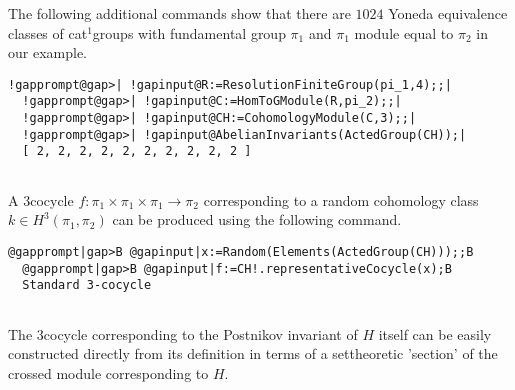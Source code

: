 \documentclass[a4paper,11pt]{report}
\begin{document}
{{\begin{Verbatim}[commandchars=!@|,fontsize=\small,frame=single,label=Example]
\end{Verbatim}
 

 The following additional commands show that there are $1024$ Yoneda equivalence classes of cat$^1$\texttt{}groups with fundamental group $\pi_1$ and $\pi_1$\texttt{} module equal to $\pi_2$ in our example. 
\begin{Verbatim}[commandchars=!@|,fontsize=\small,frame=single,label=Example]
  !gapprompt@gap>| !gapinput@R:=ResolutionFiniteGroup(pi_1,4);;|
  !gapprompt@gap>| !gapinput@C:=HomToGModule(R,pi_2);;|
  !gapprompt@gap>| !gapinput@CH:=CohomologyModule(C,3);;|
  !gapprompt@gap>| !gapinput@AbelianInvariants(ActedGroup(CH));|
  [ 2, 2, 2, 2, 2, 2, 2, 2, 2, 2 ]
  
\end{Verbatim}
 A $3$\texttt{}cocycle $f \colon \pi_1 \times \pi_1 \times \pi_1 \rightarrow \pi_2$ corresponding to a random cohomology class $k\in H^3(\pi_1,\pi_2)$ can be produced using the following command. }

 
\begin{Verbatim}[commandchars=@|B,fontsize=\small,frame=single,label=Example]
  @gapprompt|gap>B @gapinput|x:=Random(Elements(ActedGroup(CH)));;B
  @gapprompt|gap>B @gapinput|f:=CH!.representativeCocycle(x);B
  Standard 3-cocycle 
  
\end{Verbatim}
 The $3$\texttt{}cocycle corresponding to the Postnikov invariant of $H$ itself can be easily constructed directly from its definition in terms of a
set\texttt{}theoretic 'section' of the crossed module corresponding
to $H$. }

 
\end{document}

